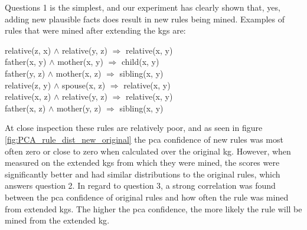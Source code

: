 Questions 1 is the simplest, and our experiment has clearly shown that, yes, adding new plausible facts does result in new rules being mined. Examples of rules that were mined after extending the \glspl{kg} are:
                            \begin{center}
                            relative(z, x) $\wedge$ relative(y, z) $\Rightarrow$ relative(x, y) \\
                          father(x, y) $\wedge$ mother(x, y) $\Rightarrow$ child(x, y) \\
                            father(y, z) $\wedge$ mother(x, z) $\Rightarrow$ sibling(x, y) \\
                            relative(z, y) $\wedge$ spouse(x, z) $\Rightarrow$ relative(x, y) \\
                             relative(x, z) $\wedge$ relative(y, z) $\Rightarrow$ relative(x, y) \\
                            father(x, z) $\wedge$ mother(y, z) $\Rightarrow$ sibling(x, y) \\
                             \end{center}
At close inspection these rules are relatively poor, and as seen in figure \ref{fig:PCA_rule_dist_new_original} the \gls{pca} confidence of new rules was most often zero or close to zero when calculated over the original \gls{kg}. However, when measured on the extended \glspl{kg} from which they were mined, the scores were significantly better and had similar distributions to the original rules, which answers question 2. In regard to question 3, a strong correlation was found between the \gls{pca} confidence of original rules and how often the rule was mined from extended \glspl{kg}. The higher the \gls{pca} confidence, the more likely the rule will be mined from the extended \gls{kg}.


